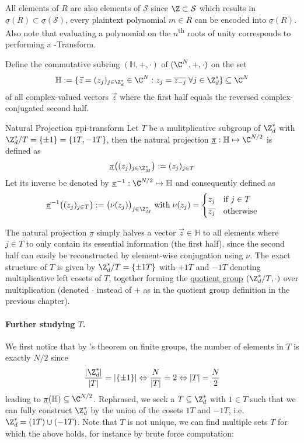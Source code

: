 All elements of $R$ are also elements of $\mathcal{S}$ since $\Z \subset \mathcal{S}$ which results in $\underline{\sigma}(R) \subset \underline{\sigma}(\mathcal{S})$, every plaintext polynomial $m \in R$ can be encoded into $\underline{\sigma}(R)$.
Also note that evaluating a polynomial on the $n$\textsuperscript{th} roots of unity corresponds to performing a -Transform.

Define the commutative subring $(\mathbb{H}, +, \cdot)$ of $(\C^N, +, \cdot)$ on the set
$$\mathbb{H} := \{\vec{z} = (z_j)_{j \in \Z_d^*} \in \C^N : z_j = \overline{z_{-j}} \;\forall j \in \Z_d^*\} \subseteq \C^N$$
of all complex-valued vectors $\vec{z}$ where the first half equals the reversed complex-conjugated second half.

\begin{definition}{Natural Projection $\underline{\pi}$}{pi-transform}
  Let $T$ be a mulitplicative subgroup of $\Z_d^*$ with $\Z_d^* / T = \{\pm 1\} = \{1T, -1T\}$, then the natural projection $\underline{\pi}: \mathbb{H} \mapsto \C^{N/2}$ is defined as
  $$\underline{\pi}\big((z_j)_{j \in \Z_M^*}\big) := (z_j)_{j \in T}$$
  Let its inverse be denoted by $\underline{\pi}\inv: \C^{N/2} \mapsto \mathbb{H}$ and consequently defined as
  $$\underline{\pi}\inv\big((z_j)_{j \in T}\big) := \big(\nu(z_j)\big)_{j \in \Z_M^*} \; \mathrm{with} \; \nu(z_j) = \begin{cases}
      z_j            & \text{if } j \in T \\
      \overline{z_j} & \text{otherwise}
    \end{cases}$$
\end{definition}

The natural projection $\underline{\pi}$ simply halves a vector $\vec{z} \in \mathbb{H}$ to all elements where $j \in T$ to only contain its essential information (the first half), since the second half can easily be reconstructed by element-wise conjugation using $\nu$.
The exact structure of $T$ is given by $\Z_d^* / T = \{\pm 1T\}$ with $+1T$ and $-1T$ denoting multiplicative left cosets of $T$, together forming the \hyperref[def:quotient-group]{quotient group} $(\Z_d^* / T, \cdot)$ over multiplication (denoted $\cdot$ instead of $+$ as in the quotient group definition in the previous chapter).

\paragraph{Further studying $T$.}
We first notice that by 's theorem on finite groups, the number of elements in $T$ is exactly $N / 2$ since $$\frac{|\Z_d^*|}{|T|} = |\{\pm 1\}| \Leftrightarrow \frac{N}{|T|} = 2 \Leftrightarrow |T| = \frac{N}{2}$$ leading to $\underline{\pi}(\mathbb{H}) \subseteq \C^{N/2}$.
Rephrased, we seek a $T \subseteq \Z_d^*$ with $1 \in T$ such that we can fully construct $\Z_d^*$ by the union of the cosets $1T$ and $-1T$, i.e. $\Z_d^* = (1T) \cup (-1T)$.
Note that $T$ is not unique, we can find multiple sets $T$ for which the above holds, for instance by brute force computation:

